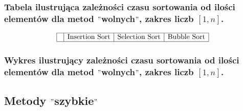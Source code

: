\documentclass[polish,polish,a4paper]{article}
\begin{document}
\begin{spacing}{1.5}
	\subsubsection*{Tabela ilustrująca zależności czasu sortowania od ilości elementów dla metod $"$wolnych$"$, zakres liczb $ [1,n] $.}
	
	\begin{figure}[H]
			\begin{equation*}
		\begin{array}{|c|c|c|c|}
		\hline
		&$Insertion Sort$&$Selection Sort$&$Bubble Sort$\\
		\hline
		\end{array}
		\end{equation*}
	\end{figure}
	
	\subsubsection*{Wykres ilustrujący zależności czasu sortowania od ilości elementów dla metod $"$wolnych$"$, zakres liczb $ [1,n] $.}
	
	\subsection{Metody $"$szybkie$"$}
\end{spacing}
	
	\newpage
	\tableofcontents
\end{document}
